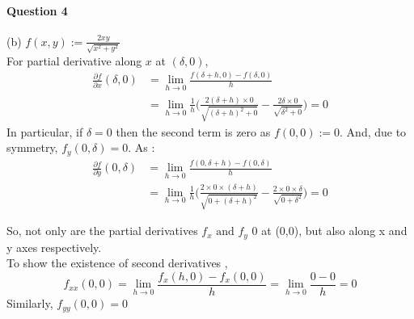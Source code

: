 \documentclass[20pt,a4paper]{extarticle} %
\theoremstyle{definition}
\theoremstyle{definition}
\begin{document}
\paragraph{Question 4} %
(b) $f(x,y):= \frac{2xy}{\sqrt{x^2+y^2}}$ \\
For partial derivative along $x$ at $(\delta,0),$
\begin{equation*}
	\begin{split}
		\frac{\partial f}{\partial x}(\delta,0) & =\lim_{h \to 0} \frac{f(\delta +h,0)-f(\delta,0)}{h}	\\
							&=\lim_{h \to 0} \frac{1}{h} \big( \frac{2(\delta+h) \times 0}
								{\sqrt{(\delta+h)^2+0}}
							- \frac{2\delta \times 0}{\sqrt{\delta^2+0}}\big)=0
	\end{split}
\end{equation*}
In particular, if $\delta=0$ then the second term is zero as $f(0,0):=0$. And, due to symmetry,
$f_y(0,\delta)=0$. As :
\begin{equation*}
	\begin{split}
		\frac{\partial f}{\partial y}(0,\delta) & =\lim_{h \to 0} \frac{f(0,\delta +h)-f(0,\delta)}{h}	\\
							&=\lim_{h \to 0} \frac{1}{h}\big(\frac{2 \times 0 \times (\delta+h)}
								{\sqrt{0+(\delta+h)^2}}
							- \frac{2\times 0 \times \delta}{\sqrt{0+\delta^2}}\big)=0
	\end{split}
\end{equation*}

So, not only are the partial derivatives $f_x \text{ and } f_y$ 0 at (0,0), but also along x and y
axes respectively.\\
To show the existence of second derivatives ,
\begin{equation*}
	f_{xx}(0,0) = \lim_{h \to 0} \frac{f_x(h,0)-f_x(0,0)}{h}=\lim_{h \to 0} \frac{0-0}{h}=0
\end{equation*}
Similarly, $f_{yy}(0,0)=0$
\end{document}
